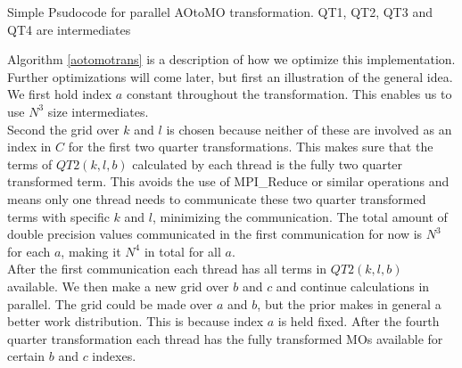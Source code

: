 \documentclass[a4paper,norsk,11pt,twoside]{report}
\begin{document}
\begin{algorithm}[H]
  
 \caption{Simple Psudocode for parallel AOtoMO transformation. QT1, QT2, QT3 and QT4 are intermediates}
 \label{aotomotrans}
\end{algorithm}

Algorithm \ref{aotomotrans} is a description of how we optimize this
implementation. Further optimizations will come later, but first an
illustration of the general idea. We first hold index $a$ constant
throughout the transformation. This enables us to use $N^3$ size
intermediates. \\

Second the grid over $k$ and $l$ is chosen because neither of these are
involved as an index in $C$ for the first two quarter
transformations. This makes sure that the terms of $QT2(k,l,b)$
calculated by each thread is the fully two quarter transformed
term. This avoids the use of MPI\_Reduce or similar operations and
means only one thread needs to communicate these two quarter
transformed terms with specific $k$ and $l$, minimizing the
communication. The total amount of double precision values
communicated in the first communication for now is $N^3$ for each $a$,
making it $N^4$ in total for all $a$. \\

After the first communication each thread has all terms in
$QT2(k,l,b)$ available. We then make a new grid over $b$ and $c$ and
continue calculations in parallel. The grid could be made over $a$ and
$b$, but the prior makes in general a better work distribution. This
is because index $a$ is held fixed. After the fourth quarter
transformation each thread has the fully transformed MOs available for
certain $b$ and $c$ indexes. \\
\end{document}
